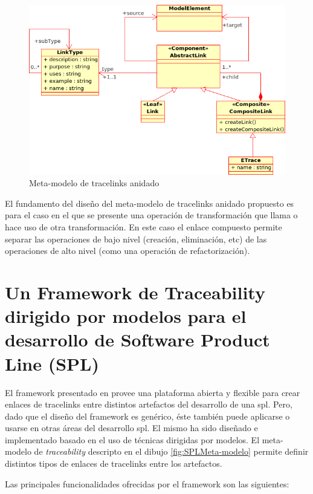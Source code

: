 \documentclass[a4paper,12pt,oneside,spanish]{book}
\begin{document}
\begin{figure}[hbtp]
\centering
\includegraphics[scale=0.6]{./img/NestedTraceMetamodel}
\caption{Meta-modelo de tracelinks anidado}
\label{fig:ETraceToolMeta-modelo}
\end{figure}

El fundamento del diseño del meta-modelo de tracelinks anidado propuesto es para el caso en el que se presente una operación de transformación que llama o hace uso de otra transformación. En este caso el enlace compuesto permite separar las operaciones de bajo nivel (creación, eliminación, etc) de las operaciones de alto nivel (como una operación de refactorización).

\section{Un Framework de Traceability dirigido por modelos para el desarrollo de Software Product Line (SPL)}

El framework presentado en \cite{SousaKuleszaRummlerAnquetilMitschkeMoreiraAmaralAraujo} provee una plataforma abierta y flexible para crear enlaces de tracelinks entre distintos artefactos del desarrollo de una \gls{spl}. Pero, dado que el diseño del framework es genérico, éste también puede aplicarse o usarse en otras áreas del desarrollo \gls{spl}. El mismo ha sido diseñado e implementado basado en el uso de técnicas dirigidas por modelos. El meta-modelo de \textit{traceability} descripto en el dibujo \ref{fig:SPLMeta-modelo} permite definir distintos tipos de enlaces de tracelinks entre los artefactos.

Las principales funcionalidades ofrecidas por el framework son las siguientes:
\end{document}
